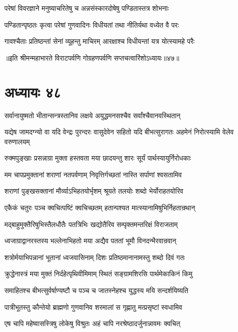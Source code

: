 \twolineshloka
{परेषां विवरज्ञाने मनुष्याचरितेषु च}
{अन्नसंस्कारदोषेषु पण्डितास्तत्र शोभनाः}


\twolineshloka
{पण्डितान्पृष्ठतः कृत्वा परेषां गुणवादिनः}
{विधीयतां तथा नीतिर्यथा वध्येत वै परः}


\twolineshloka
{गावश्चैताः प्रतिष्ठन्तां सेनां व्यूहन्तु माचिरम्}
{आरक्षाश्च विधीयन्तां यत्र योत्स्यामहे परैः}

॥इति श्रीमन्महाभारते विराटपर्वणि गोग्रहणपर्वणि सप्तचत्वारिंशोऽध्यायः॥४७॥

\chapter{अध्यायः ४८}

\twolineshloka
{सर्वानायुष्मतो भीतान्सन्त्रस्तानिव लक्षये}
{अयुद्धमनसश्चैव सर्वांश्चैवानवस्थितान्}


\threelineshloka
{यद्येष जामदग्न्यो वा यदि वेन्द्रः पुरन्दरः}
{वासुदेवेन सहितो यदि बीभत्सुरागतः}
{अहमेनं निरोत्स्यामि वेलेव वरुणालयम्}


\twolineshloka
{रुक्मपुङ्खाः प्रसन्नाग्रा मुक्ता हस्तवता मया}
{छादयन्तु शारः सूर्यं पार्थस्यायुर्निरोधकाः}


\twolineshloka
{मम चापप्रमुक्तानां शराणां नतपर्वणाम्}
{निवृत्तिर्गच्छतां नास्ति सर्पाणां श्वसतामिव}


\twolineshloka
{शराणां पुङ्खसक्तानां मौर्व्याऽभिहतयोर्भृशम्}
{श्रूयते तलयोः शब्दो भेर्योराहतयोरिव}


\twolineshloka
{एकैकं चतुरः पञ्च क्वचित्पष्टिं क्वचिच्छतम्}
{हतान्पश्यत मात्स्यानामिषुभिर्निहतान्रथान्}


\twolineshloka
{मद्बाहुमुक्तैरिषुभिस्तैलधौतैः पतत्रिभिः}
{खद्योतैरिव सम्पृक्तमन्तरिक्षं विराजताम्}


\twolineshloka
{ध्वजाग्राद्वानरस्तस्य भल्लेनाभिहतो मया}
{अद्यैव पततां भूमौ विनदन्भैरवान्रवान्}


\twolineshloka
{शत्रोर्मयाभिपन्नानां भूतानां ध्वजवासिनाम्}
{दिशः प्रतिष्ठमानानामस्तु शब्दो दिवं गतः}


\twolineshloka
{क्रुद्धेनास्त्रं मया मुक्तं निर्दहेत्पृथिवीमिमाम्}
{स्थितं सङ्ग्रामशिरसि पार्थमेकाकिनं किमु}


\twolineshloka
{समाहितश्च बीभत्सुर्वर्षाण्यष्टौ च पञ्च च}
{जातस्नेहश्च युद्धस्य मयि सन्दर्शयिष्यति}


\twolineshloka
{पात्रीभूतस्तु कौन्तेयो ब्राह्मणो गुणवानिव}
{शरमालां स गृह्णातु मत्प्रसृष्टां स्वधामिव}


\twolineshloka
{एष चापि महेष्वासस्त्रिषु लोकेषु विश्रुतः}
{अहं चापि नरश्रेष्ठादर्जुनान्नावमः क्वचित्}



